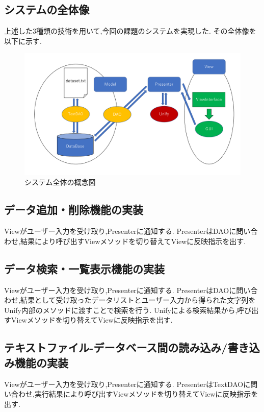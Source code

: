 \documentclass[12pt]{jarticle}
\begin{document}
\subsection{システムの全体像}
上述した3種類の技術を用いて,今回の課題のシステムを実現した.
その全体像を以下に示す.
\begin{figure}[!hbt]
    \centering
    \includegraphics[scale=0.35]{images/architecture_all.pdf}
    \caption{システム全体の概念図}
\end{figure}

\subsection{データ追加・削除機能の実装}
Viewがユーザー入力を受け取り,Presenterに通知する.
PresenterはDAOに問い合わせ,結果により呼び出すViewメソッドを切り替えてViewに反映指示を出す.

\subsection{データ検索・一覧表示機能の実装}
Viewがユーザー入力を受け取り,Presenterに通知する.
PresenterはDAOに問い合わせ,結果として受け取ったデータリストとユーザー入力から得られた文字列をUnify内部のメソッドに渡すことで検索を行う.
Unifyによる検索結果から,呼び出すViewメソッドを切り替えてViewに反映指示を出す.

\subsection{テキストファイル-データベース間の読み込み/書き込み機能の実装}
Viewがユーザー入力を受け取り,Presenterに通知する.
PresenterはTextDAOに問い合わせ,実行結果により呼び出すViewメソッドを切り替えてViewに反映指示を出す.
\end{document}
